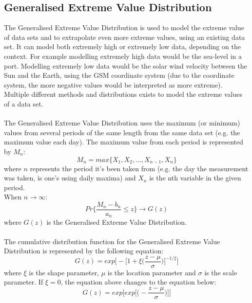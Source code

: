 \documentclass[12pt]{article}
\begin{document}
    \subsection{Generalised Extreme Value Distribution}\label{sec:gev}
        The Generalised Extreme Value Distribution is used to model the extreme value of data sets and to extrapolate even more extreme values, using an existing data set. It can model both extremely high or extremely low data, depending on the context. For example modelling extremely high data would be the sea-level in a port. Modelling extremely low data would be the solar wind velocity between the Sun and the Earth, using the GSM coordinate system (due to the coordinate system, the more negative values would be interpreted as more extreme). Multiple different methods and distributions exists to model the extreme values of a data set.\\ \\
        The Generalised Extreme Value Distribution uses the maximum (or minimum) values from several periods of the same length from the same data set (e.g. the maximum value each day). The maximum value from each period is represented by $M_n$:
        \begin{equation}
            M_n = max\{X_1, X_2, ..., X_{n-1}, X_n\}
        \end{equation}
        where $n$ represents the period it's been taken from (e.g. the day the measurement was taken, is one's using daily maxima) and $X_n$ is the nth variable in the given period.\\
        When $n\rightarrow \infty$:
        \begin{equation}
            Pr\Bigg\{ \frac{M_n - b_n}{a_n} \leq z\Bigg\} \rightarrow G(z)
        \end{equation}
        where $G(z)$ is the Generalised Extreme Value Distribution\cite{2001coles}.\\ \\
        The cumulative distribution function for the Generalised Extreme Value Distribution is represented by the following equation\cite{2001coles}:
        \begin{equation}
            G(z) = exp\Bigg [-\Bigg [1+\xi \Bigg (\frac{z-\mu}{\sigma}\Bigg )\Bigg ]^{-1/\xi}\Bigg ]
        \end{equation}
        where $\xi$ is the shape parameter, $\mu$ is the location parameter and $\sigma$ is the scale parameter. If $\xi=0$, the equation above changes to the equation below:
        \begin{equation}
            G(z) = exp\Bigg [exp\Bigg [\Bigg (-\frac{z-\mu}{\sigma}\Bigg )\Bigg ]\Bigg ]
        \end{equation}\\
\end{document}
